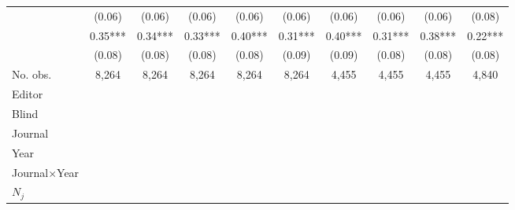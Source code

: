 \begin{table}
\begin{threeparttable}
\begin{tabular}{p{3cm}S@{}S@{}S@{}S@{}S@{}S@{}S@{}S@{}S@{}}
                                          &      (0.06)   &      (0.06)   &      (0.06)   &      (0.06)   &      (0.06)   &      (0.06)   &      (0.06)   &      (0.06)   &      (0.08)   \\
               &        0.35***&        0.34***&        0.33***&        0.40***&        0.31***&        0.40***&        0.31***&        0.38***&        0.22***\\
                                          &      (0.08)   &      (0.08)   &      (0.08)   &      (0.08)   &      (0.09)   &      (0.09)   &      (0.08)   &      (0.08)   &      (0.08)   \\
            \midrule
            No. obs.                      &       8,264   &       8,264   &       8,264   &       8,264   &       8,264   &       4,455   &       4,455   &       4,455   &       4,840   \\
            \midrule
            Editor               &           {}   &           {}   &           {}   &           {}   &           {}   &           {}   &           {}   &           {}   &           {}   \\
            Blind                         &           {}   &           {}   &           {}   &           {}   &           {}   &           {}   &           {}   &           {}   &           {}   \\
            Journal                       &           {}   &           {}   &               &               &               &               &               &               &               \\
            Year                          &               &           {}   &               &               &               &               &               &               &               \\
            Journal\(\times\)Year                  &               &               &           {}   &           {}   &           {}   &           {}   &           {}   &           {}   &           {}   \\
            \(N_j\)                       &               &               &               &           {}   &           {}   &           {}   &           {}   &           {}   &           {}   \\

\end{tabular}
\end{threeparttable}
\end{table}
